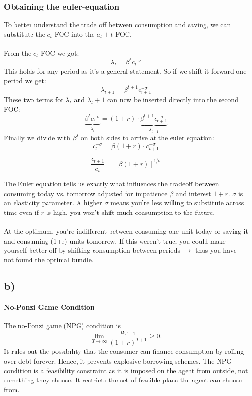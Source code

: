 \documentclass[12pt]{article}
\begin{document}
\subsubsection{Obtaining the euler-equation}
To better understand the trade off between consumption and saving, we can substitute the $c_t$ FOC into the $a_t+t$ FOC. 
\\
\\
From the $c_t$ FOC we got:
$$
\lambda_t=\beta^t c_t^{-\sigma}
$$
This holds for any period as it's a general statement. So if we shift it forward one period we get:
$$
\lambda_{t+1}=\beta^{t+1} c_{t+1}^{-\sigma}
$$
These two terms for $\lambda_t$ and $\lambda_t+1$ can now be inserted directly into the second FOC:
$$
\underbrace{\beta^t c_t^{-\sigma}}_{\lambda_t}=(1+r) \cdot \underbrace{\beta^{t+1} c_{t+1}^{-\sigma}}_{\lambda_{t+1}}
$$
Finally we divide with $\beta^t$ on both sides to arrive at the euler equation:
$$
\boxed{c_t^{-\sigma}=\beta(1+r) \cdot c_{t+1}^{-\sigma}}
$$

$$\frac{c_{t+1}}{c_t}=[\beta(1+r)]^{1 / \sigma}$$

The Euler equation tells us exactly what influences the tradeoff between consuming today vs. tomorrow adjusted for impatience $\beta$ and interest $1+r$. $\sigma$ is an elasticity parameter. A higher $\sigma$ means you're less willing to substitute across time even if $r$ is high, you won't shift much consumption to the future. 
\\
\\
At the optimum, you're indifferent between consuming one unit today or saving it and consuming (1+r) units tomorrow. If this weren't true, you could make yourself better off by shifting consumption between periods $\rightarrow$ thus you have not found the optimal bundle.

\subsection{b)}

\paragraph{No-Ponzi Game Condition}

The no-Ponzi game (NPG) condition is
\[
\lim_{T \to \infty} \frac{a_{T+1}}{(1+r)^{T+1}} \ge 0.
\]
It rules out the possibility that the consumer can finance consumption by rolling over debt forever. Hence, it prevents explosive borrowing schemes. The NPG condition is a feasibility constraint as it is imposed on the agent from outside, not something they choose. It restricts the set of feasible plans the agent can choose from.
\end{document}
